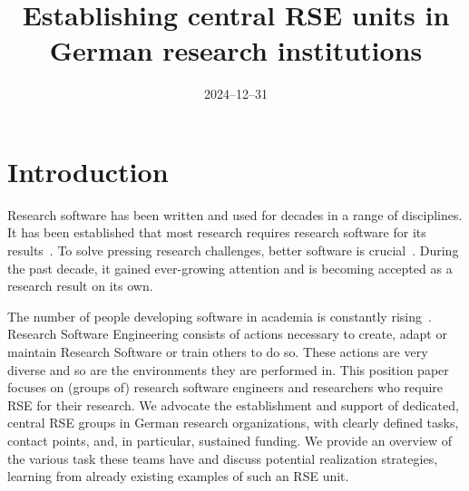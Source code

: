 \documentclass[a4paper]{article}
\title{Establishing central RSE units in German research institutions}
\date{2024--12--31}
\begin{document}
\maketitle

\section{Introduction}
Research software has been written and used for decades in a range of disciplines.
It has been established that most research requires research software for its results~\autocite{Hannay2009, Hettrick2015}.
To solve pressing research challenges, better software is crucial~\autocite{Goble2014}.
During the past decade, it gained ever-growing attention and is becoming accepted as a research result on its own.

The number of people developing software in academia is constantly rising~\autocite{Hannay2009, Hettrick2015}.
Research Software Engineering consists of actions necessary to create, adapt or maintain Research Software or train others to do so.
These actions are very diverse and so are the environments they are performed in.
This position paper focuses on (groups of) research software engineers and researchers who require RSE for their research.
We advocate the establishment and support of dedicated, central RSE groups in German research organizations, with clearly defined tasks, contact points, and, in particular, sustained funding.
We provide an overview of the various task these teams have and discuss potential realization strategies, learning from already existing examples of such an RSE unit.
\end{document}

